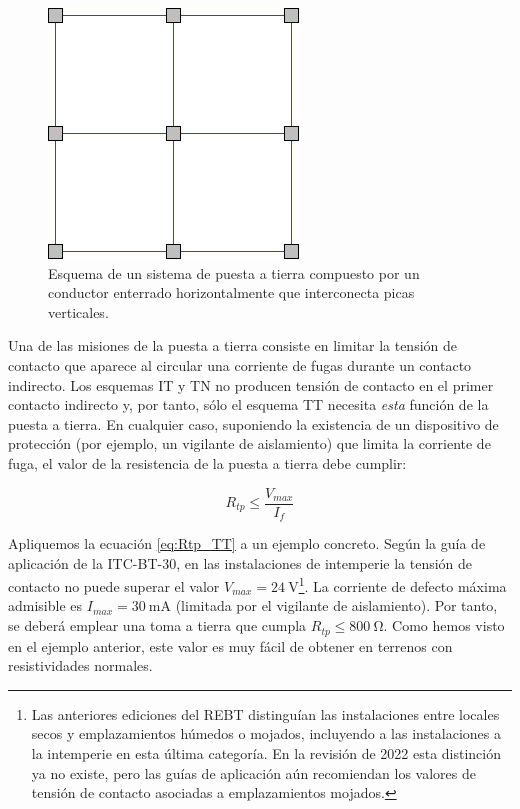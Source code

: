 \begin{figure}
  \centering
  \includegraphics{../figs/PuestaTierra.pdf}
  \caption{Esquema de un sistema de puesta a tierra compuesto por un conductor enterrado horizontalmente que interconecta picas verticales.}
  \label{fig:puesta-tierra}
\end{figure}

Una de las misiones de la puesta a tierra consiste en limitar la
tensión de contacto que aparece al circular una corriente de fugas
durante un contacto indirecto. Los esquemas IT y TN no producen tensión
de contacto en el primer contacto indirecto y, por tanto, sólo el
esquema TT necesita \emph{esta} función de la puesta a tierra. En
cualquier caso, suponiendo la existencia de un dispositivo de protección
(por ejemplo, un vigilante de aislamiento) que limita la corriente
de fuga, el valor de la resistencia de la puesta a tierra debe cumplir:

\begin{equation}
R_{tp}\leq\frac{V_{max}}{I_{f}}\label{eq:Rtp_TT}\end{equation}

Apliquemos la ecuación \ref{eq:Rtp_TT} a un ejemplo concreto. Según la
guía de aplicación de la ITC-BT-30, en las instalaciones de intemperie
la tensión de contacto no puede superar el valor
$V_{max}=\SI{24}{\volt}$\footnote{Las anteriores ediciones del REBT distinguían las instalaciones entre locales secos y emplazamientos húmedos o mojados, incluyendo a las instalaciones a la intemperie en esta última categoría. En la revisión de 2022 esta distinción ya no existe, pero las guías de aplicación aún recomiendan los valores de tensión de contacto asociadas a emplazamientos mojados.}. La corriente de defecto máxima admisible es
$I_{max}=\SI{30}{\milli\ampere}$ (limitada por el vigilante de
aislamiento). Por tanto, se deberá emplear una toma a tierra que
cumpla $R_{tp}\leq\SI{800}{\ohm}$. Como hemos visto en el ejemplo
anterior, este valor es muy fácil de obtener en terrenos con
resistividades normales.

